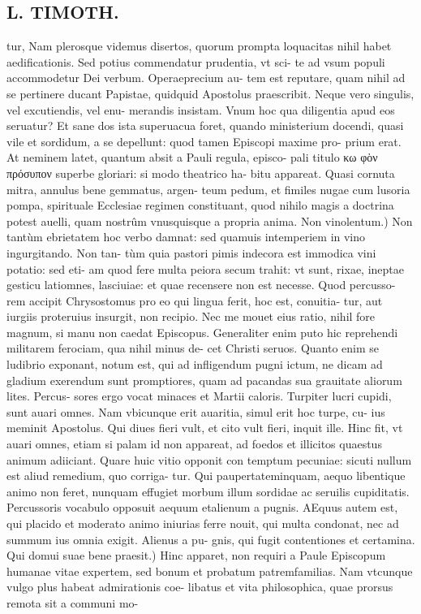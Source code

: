 \documentclass{article}
\begin{document}
\begin{pages}
\section*{L. TIMOTH. }
\marginpar{[ p.34 ]}\pstart tur, Nam plerosque videmus disertos, quorum prompta loquacitas nihil habet aedificationis. Sed potius commendatur prudentia, vt sci- te ad vsum populi accommodetur Dei verbum. Operaeprecium au- tem est reputare, quam nihil ad se pertinere ducant Papistae, quidquid Apostolus praescribit. Neque vero singulis, vel excutiendis, vel enu- merandis insistam. Vnum hoc qua diligentia apud eos seruatur? Et sane dos ista superuacua foret, quando ministerium docendi, quasi vile et sordidum, a se depellunt: quod tamen Episcopi maxime pro- prium erat. At neminem latet, quantum absit a Pauli regula, episco- pali titulo κω φὸν πρόσυπον superbe gloriari: si modo theatrico ha- bitu appareat. Quasi cornuta mitra, annulus bene gemmatus, argen- teum pedum, et fimiles nugae cum lusoria pompa, spirituale Ecclesiae regimen constituant, quod nihilo magis a doctrina potest auelli, quam nostrûm vnusquisque a propria anima.  \pend\pstart Non vinolentum.) Non tantùm ebrietatem hoc verbo damnat: sed quamuis intemperiem in vino ingurgitando. Non tan- tùm quia pastori pimis indecora est immodica vini potatio: sed eti- am quod fere multa peiora secum trahit: vt sunt, rixae, ineptae gesticu latiomnes, lasciuiae: et quae recensere non est necesse. Quod percusso- rem accipit Chrysostomus pro eo qui lingua ferit, hoc est, conuitia- tur, aut iurgiis proteruius insurgit, non recipio. Nec me mouet eius ratio, nihil fore magnum, si manu non caedat Episcopus. Generaliter enim puto hic reprehendi militarem ferociam, qua nihil minus de- cet Christi seruos. Quanto enim se ludibrio exponant, notum est, qui ad infligendum pugni ictum, ne dicam ad gladium exerendum sunt promptiores, quam ad pacandas sua grauitate aliorum lites. Percus- sores ergo vocat minaces et Martii caloris. Turpiter lucri cupidi, sunt auari omnes. Nam vbicunque erit auaritia, simul erit hoc turpe, cu- ius meminit Apostolus. Qui diues fieri vult, et cito vult fieri, inquit ille. Hinc fit, vt auari omnes, etiam si palam id non appareat, ad foedos et illicitos quaestus animum adiiciant. Quare huic vitio opponit con temptum pecuniae: sicuti nullum est aliud remedium, quo corriga- tur. Qui paupertateminquam, aequo libentique animo non feret, nunquam effugiet morbum illum sordidae ac seruilis cupiditatis. Percussoris vocabulo opposuit aequum etalienum a pugnis. AEquus autem est, qui placido et moderato animo iniurias ferre nouit, qui multa condonat, nec ad summum ius omnia exigit. Alienus a pu- gnis, qui fugit contentiones et certamina.  \pend\pstart Qui domui suae bene praesit.) Hinc apparet, non requiri a Paule Episcopum humanae vitae expertem, sed bonum et probatum patremfamilias. Nam vtcunque vulgo plus habeat admirationis coe- libatus et vita philosophica, quae prorsus remota sit a communi mo-  \pend

\end{pages}
\end{document}
